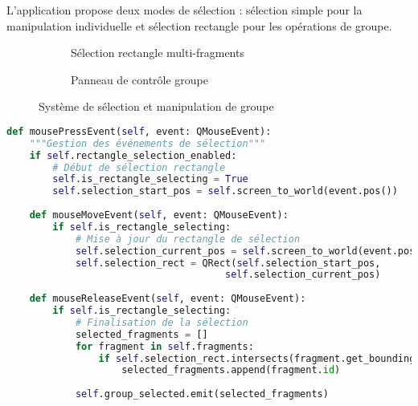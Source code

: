 \documentclass[12pt,a4paper]{report}
\begin{document}
L'application propose deux modes de sélection : sélection simple pour la manipulation individuelle et sélection rectangle pour les opérations de groupe.


\begin{figure}[H]
\centering
\begin{subfigure}{0.48\textwidth}
\caption{Sélection rectangle multi-fragments}
\end{subfigure}
\hfill
\begin{subfigure}{0.48\textwidth}
\caption{Panneau de contrôle groupe}
\end{subfigure}
\caption{Système de sélection et manipulation de groupe}
\label{fig:selection_groupe}
\end{figure}

\begin{lstlisting}[language=Python, caption=Implémentation de la sélection rectangle]
def mousePressEvent(self, event: QMouseEvent):
    """Gestion des événements de sélection"""
    if self.rectangle_selection_enabled:
        # Début de sélection rectangle
        self.is_rectangle_selecting = True
        self.selection_start_pos = self.screen_to_world(event.pos())
        
    def mouseMoveEvent(self, event: QMouseEvent):
        if self.is_rectangle_selecting:
            # Mise à jour du rectangle de sélection
            self.selection_current_pos = self.screen_to_world(event.pos())
            self.selection_rect = QRect(self.selection_start_pos, 
                                      self.selection_current_pos)
            
    def mouseReleaseEvent(self, event: QMouseEvent):
        if self.is_rectangle_selecting:
            # Finalisation de la sélection
            selected_fragments = []
            for fragment in self.fragments:
                if self.selection_rect.intersects(fragment.get_bounding_box()):
                    selected_fragments.append(fragment.id)
            
            self.group_selected.emit(selected_fragments)
\end{lstlisting}
\end{document}
